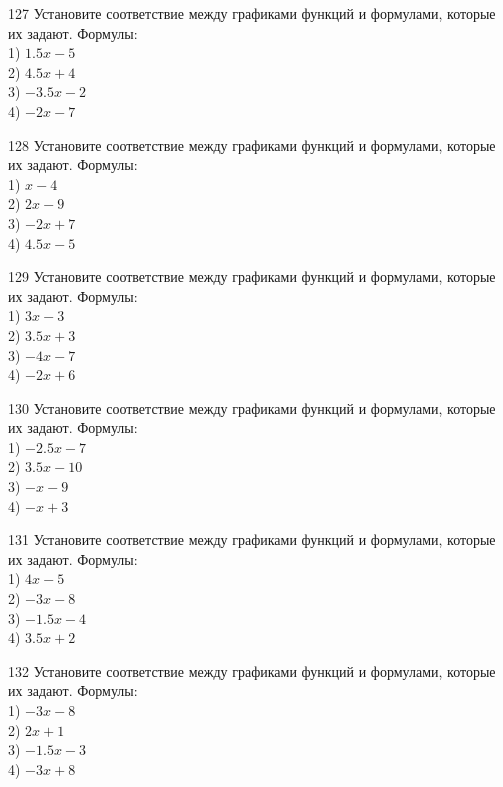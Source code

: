 \documentclass[4apaper]{article}
\begin{document}
\begin{taskBN}{127}
Установите соответствие между графиками функций и формулами, которые их задают. Формулы: \\1) $1.5x-5$\\2) $4.5x+4$\\3) $-3.5x-2$\\4) $-2x-7$
\end{taskBN}

\begin{taskBN}{128}
Установите соответствие между графиками функций и формулами, которые их задают. Формулы: \\1) $x-4$\\2) $2x-9$\\3) $-2x+7$\\4) $4.5x-5$
\end{taskBN}

\begin{taskBN}{129}
Установите соответствие между графиками функций и формулами, которые их задают. Формулы: \\1) $3x-3$\\2) $3.5x+3$\\3) $-4x-7$\\4) $-2x+6$
\end{taskBN}

\begin{taskBN}{130}
Установите соответствие между графиками функций и формулами, которые их задают. Формулы: \\1) $-2.5x-7$\\2) $3.5x-10$\\3) $-x-9$\\4) $-x+3$
\end{taskBN}

\begin{taskBN}{131}
Установите соответствие между графиками функций и формулами, которые их задают. Формулы: \\1) $4x-5$\\2) $-3x-8$\\3) $-1.5x-4$\\4) $3.5x+2$
\end{taskBN}

\begin{taskBN}{132}
Установите соответствие между графиками функций и формулами, которые их задают. Формулы: \\1) $-3x-8$\\2) $2x+1$\\3) $-1.5x-3$\\4) $-3x+8$
\end{taskBN}
\end{document}
